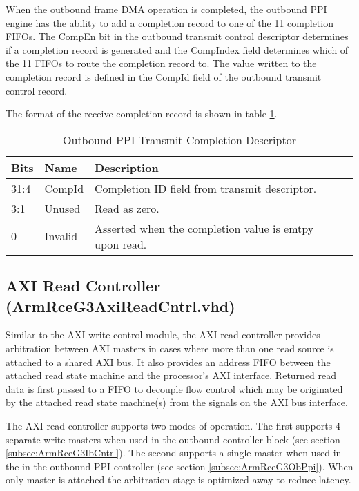 \documentclass[11pt]{article}
\begin{document}
When the outbound frame DMA operation is completed, the outbound PPI engine has the ability to add a completion record to one of the 11 
completion FIFOs. The CompEn bit in the outbound transmit control descriptor determines if a completion record is 
generated and the CompIndex field determines which of the 11 FIFOs to route the completion record to. The value written 
to the completion record is defined in the CompId field of the outbound transmit control record. 

The format of the receive completion record is shown in table \ref{tab:ob_ppi_comp}.

\begin{table}[H]
\small
\centering
   \begin{tabular}{| l | l | l | l | l | } 
      \hline \textbf{Bits} & \textbf{Name} & \textbf{Description} \\
      \hline 31:4          & CompId        & Completion ID field from transmit descriptor.                           \\
      \hline 3:1           & Unused        & Read as zero.                          \\
      \hline 0             & Invalid       & Asserted when the completion value is emtpy upon read. \\
      \hline
   \end{tabular}
   \caption{Outbound PPI Transmit Completion Descriptor}
   \label{tab:ob_ppi_comp}
\end{table}

\subsection{AXI Read Controller (ArmRceG3AxiReadCntrl.vhd)}
\label{subsec:ArmRceG3AxiReadCntrl}

Similar to the AXI write control module, the AXI read controller provides arbitration between AXI masters in cases
where more than one read source is attached to a shared AXI bus. It also provides an address FIFO 
between the attached read state machine and the processor's AXI interface. Returned read data is first
passed to a FIFO to decouple flow control which may be originated by the attached read state machine(s) from
the signals on the AXI bus interface.

The AXI read controller supports two modes of operation. The first supports 4 separate write masters when
used in the outbound controller block (see section \ref{subsec:ArmRceG3IbCntrl}). The second supports a single 
master when used in the in the outbound PPI controller (see section \ref{subsec:ArmRceG3ObPpi}).
When only master is attached the arbitration stage is optimized away to reduce latency.
\end{document}
